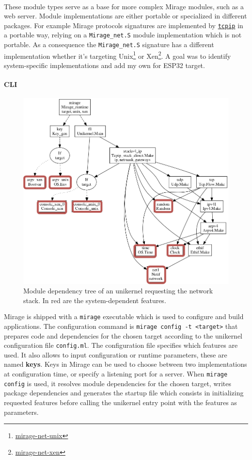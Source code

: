 \documentclass[a4paper]{article}
\begin{document}
\paragraph{}
These module types serve as a base for more complex Mirage modules, such as a web server. Module implementations 
are either portable or specialized in different packages. For example Mirage protocols signatures are implemented 
by \href{https://github.com/mirage/mirage-tcpip}{\texttt{tcpip}} in a portable way, relying on a \texttt{Mirage\_net.S} 
module implementation which is not portable. As a consequence the \texttt{Mirage\_net.S} signature has a different 
implementation whether it's targeting Unix\footnote{\href{https://github.com/mirage/mirage-net-unix}{mirage-net-unix}} or Xen\footnote{\href{https://github.com/mirage/mirage-net-xen}{mirage-net-xen}}. 
A goal was to identify system-specific implementations and add my own for ESP32 target.
\paragraph{CLI}
\begin{figure}
\includegraphics[width=0.4\columnwidth]{mirage_app.png}
\caption{Module dependency tree of an unikernel requesting the network stack. In red are the system-dependent features.}
\end{figure}
Mirage is shipped with a \texttt{mirage} executable which is used to configure and build applications. 
The configuration command is \texttt{mirage config -t <target>} that prepares code and dependencies for 
the chosen target according to the unikernel configuration file \texttt{config.ml}. 
The configuration file specifies which features are used. It also allows to input configuration or runtime parameters, 
these are named \textbf{keys}. Keys in Mirage can be used to choose between two implementations at configuration time, 
or specify a listening port for a server. When \texttt{mirage config} is used, it resolves module dependencies 
for the chosen target, writes package dependencies and generates the startup file which consists in initializing 
requested features before calling the unikernel entry point with the features as parameters.
\end{document}
